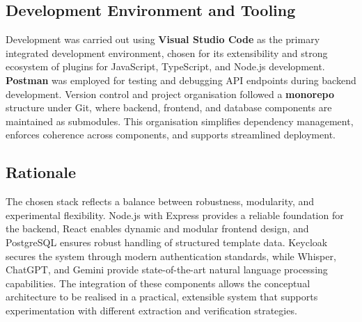 \subsection*{Development Environment and Tooling}
Development was carried out using \textbf{Visual Studio Code} as the primary integrated development environment, chosen for its extensibility and strong ecosystem of plugins for JavaScript, TypeScript, and Node.js development. \textbf{Postman} was employed for testing and debugging API endpoints during backend development. Version control and project organisation followed a \textbf{monorepo} structure under Git, where backend, frontend, and database components are maintained as submodules. This organisation simplifies dependency management, enforces coherence across components, and supports streamlined deployment.

\subsection*{Rationale}
The chosen stack reflects a balance between robustness, modularity, and experimental flexibility. Node.js with Express provides a reliable foundation for the backend, React enables dynamic and modular frontend design, and PostgreSQL ensures robust handling of structured template data. Keycloak secures the system through modern authentication standards, while Whisper, ChatGPT, and Gemini provide state-of-the-art natural language processing capabilities. The integration of these components allows the conceptual architecture to be realised in a practical, extensible system that supports experimentation with different extraction and verification strategies.

